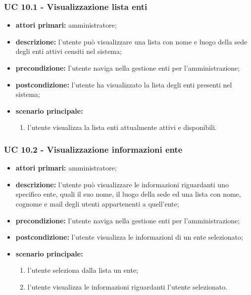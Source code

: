 			\subsubsection{UC 10.1 - Visualizzazione lista enti }
			\begin{itemize}
				\item \textbf{attori primari:} amministratore;
				\item \textbf{descrizione:} l'utente può visualizzare una lista con nome e luogo della sede degli enti attivi censiti nel sistema;
				\item \textbf{precondizione:} l'utente naviga nella gestione enti per l'amministrazione;
				\item \textbf{postcondizione:} l'utente ha visualizzato la lista degli enti presenti nel sistema;
				\item \textbf{scenario principale:}
				\begin{enumerate}
					\item{l'utente visualizza la lista enti attualmente attivi e disponibili.}
				\end{enumerate}
			\end{itemize}

			\subsubsection{UC 10.2 - Visualizzazione informazioni ente}
			\begin{itemize}
				\item \textbf{attori primari:} amministratore;
				\item \textbf{descrizione:} l'utente può visualizzare le informazioni riguardanti uno specifico ente, quali il suo nome, il luogo della sede ed una lista con nome, cognome e mail degli utenti appartenenti a quell'ente;
				\item \textbf{precondizione:} l'utente naviga nella gestione enti per l'amministrazione;
				\item \textbf{postcondizione:} l'utente visualizza le informazioni di un ente selezionato;
				\item \textbf{scenario principale:}
				\begin{enumerate}
					\item{l'utente seleziona dalla lista un ente;}
					\item{l'utente visualizza le informazioni riguardanti l'utente selezionato.}
				\end{enumerate}
			\end{itemize}

